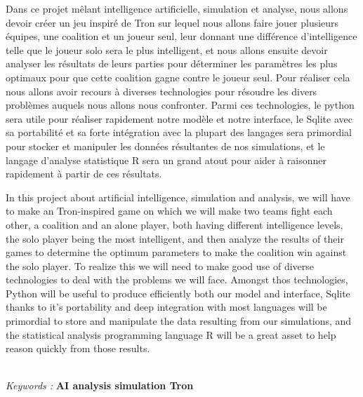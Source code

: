 \documentclass[
	headsepline=on,
	footsepline=on,
	twoside=off,
	abstract=on,
	DIV=10
]{scrreprt}
\newenvironment{abstractpage}
{\cleardoublepage\vspace*{\fill}\thispagestyle{empty}}
{\vfill\cleardoublepage}
\renewenvironment{abstract}[1]
{\bigskip\selectlanguage{#1}%
	\begin{center}\bfseries\abstractname\end{center}}
{\par\bigskip}
\newcommand{\keywords}{\sffamily\textit{Keywords : }\bfseries}
\begin{document}
	\begin{abstractpage}
		\begin{abstract}{french}
			Dans ce projet mêlant intelligence artificielle, simulation et analyse, nous allons devoir créer un jeu inspiré de Tron sur lequel nous allons faire jouer plusieurs équipes, une coalition et un joueur seul, leur donnant une différence d'intelligence telle que le joueur solo sera le plus intelligent, et nous allons ensuite devoir analyser les résultats de leurs parties pour déterminer les paramètres les plus optimaux pour que cette coalition gagne contre le joueur seul. Pour réaliser cela nous allons avoir recours à diverses technologies pour résoudre les divers problèmes auquels nous allons nous confronter. Parmi ces technologies, le python sera utile pour réaliser rapidement notre modèle et notre interface, le Sqlite avec sa portabilité et sa forte intégration avec la plupart des langages sera primordial pour stocker et manipuler les données résultantes de nos simulations, et le langage d'analyse statistique R sera un grand atout pour aider à raisonner rapidement à partir de ces résultats.

		\end{abstract}
	
		\begin{abstract}{english}
			In this project about artificial intelligence, simulation and analysis, we will have to make an Tron-inspired game on which we will make two teams fight each other, a coalition and an alone player, both having different intelligence levels, the solo player being the most intelligent, and then analyze the results of their games to determine the optimum parameters to make the coalition win against the solo player. To realize this we will need to make good use of diverse technologies to deal with the problems we will face. Amongst thos technologies, Python will be useful to produce efficiently both our model and interface, Sqlite thanks to it's portability and deep integration with most languages will be primordial to store and manipulate the data resulting from our simulations, and the statistical analysis programming language R will be a great asset to help reason quickly from those results.

		\end{abstract}
		\hfill\\
		\keywords{AI analysis simulation Tron }
	\end{abstractpage}

	
	
	
\end{document}
